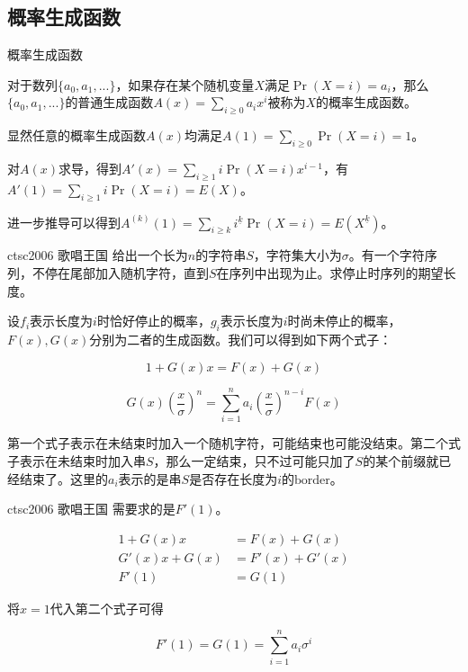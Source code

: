 \documentclass{beamer}
\begin{document}
	\subsection{概率生成函数}
	\begin{frame}{概率生成函数}
		
		对于数列$\{a_0,a_1,...\}$，如果存在某个随机变量$X$满足$\Pr(X=i)=a_i$，那么$\{a_0,a_1,...\}$的普通生成函数$A(x)=\sum_{i \ge 0} a_ix^i$被称为$X$的概率生成函数。
		
		显然任意的概率生成函数$A(x)$均满足$A(1)=\sum_{i \ge 0} \Pr(X=i) = 1$。
		
		对$A(x)$求导，得到$A'(x)=\sum_{i \ge 1} i \Pr(X=i)x^{i-1}$，有$A'(
		1)=\sum_{i \ge 1} i \Pr(X=i)=E(X)$。
		
		进一步推导可以得到$A^{(k)}(1)=\sum_{i \ge k}i^{\underline{k}}\Pr(X=i)=E(X^{\underline{k}})$。
	\end{frame}
	\begin{frame}{ctsc2006 歌唱王国}
		给出一个长为$n$的字符串$S$，字符集大小为$\sigma$。有一个字符序列，不停在尾部加入随机字符，直到$S$在序列中出现为止。求停止时序列的期望长度。\pause
		
		设$f_i$表示长度为$i$时恰好停止的概率，$g_i$表示长度为$i$时尚未停止的概率，$F(x),G(x)$分别为二者的生成函数。我们可以得到如下两个式子：
		
		$$1+G(x)x=F(x)+G(x)$$
		
		$$G(x)(\frac{x}{\sigma})^n=\sum_{i=1}^na_i(\frac{x}{\sigma})^{n-i}F(x)$$
		
		第一个式子表示在未结束时加入一个随机字符，可能结束也可能没结束。第二个式子表示在未结束时加入串$S$，那么一定结束，只不过可能只加了$S$的某个前缀就已经结束了。这里的$a_i$表示的是串$S$是否存在长度为$i$的$\mathrm{border}$。
	\end{frame}
	\begin{frame}{ctsc2006 歌唱王国}
		需要求的是$F'(1)$。
		
		$$\begin{aligned}
		1+G(x)x&=F(x)+G(x)\\
		G'(x)x+G(x)&=F'(x)+G'(x)\\
		F'(1)&=G(1) 
		\end{aligned}$$
		
		将$x=1$代入第二个式子可得
		
		$$F'(1)=G(1)=\sum_{i=1}^na_i\sigma^i$$
	\end{frame}
\end{document}
